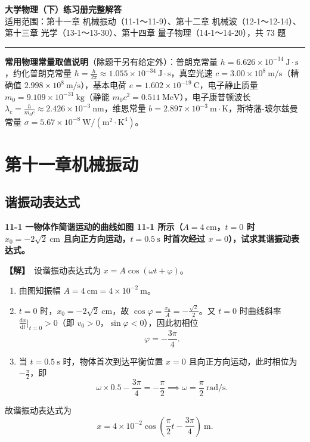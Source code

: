 \documentclass[zihao=5,a4paper,UTF8]{ctexart}
\newenvironment{prob}[2]{%
    \par\vspace{6pt}\noindent\textbf{\color{navy}#1} \textbf{#2}\par\nopagebreak\vspace{2pt}%
}{%
    \par\vspace{4pt}%
}
\newcommand{\sol}{\noindent\textbf{\color{tealaccent}【解】}\ }
\newcommand{\dd}{\mathrm{d}}
\begin{document}
\begin{center}
    {\Huge\bfseries\color{navy} 大学物理（下）练习册完整解答}\\[6pt]
    {\small\color{gray} 适用范围：第十一章 机械振动（11-1～11-9）、第十二章 机械波（12-1～12-14）、第十三章 光学（13-1～13-30）、第十四章 量子物理（14-1～14-20），共 73 题}
\end{center}
\vspace{2pt}
\hrule
\vspace{6pt}

\begin{tcolorbox}[colback=softbg, colframe=navy, boxrule=0.6pt, arc=2pt, left=8pt, right=8pt, top=5pt, bottom=5pt]
\small
\textbf{常用物理常量取值说明}（除题干另有给定外）：普朗克常量 $h = 6.626\times 10^{-34}\ \mathrm{J\cdot s}$，约化普朗克常量 $\hbar = \frac{h}{2\pi} \approx 1.055\times 10^{-34}\ \mathrm{J\cdot s}$，真空光速 $c = 3.00\times 10^{8}\ \mathrm{m/s}$（精确值 $2.998\times 10^{8}\ \mathrm{m/s}$），基本电荷 $e = 1.602\times 10^{-19}\ \mathrm{C}$，电子静止质量 $m_0 = 9.109\times 10^{-31}\ \mathrm{kg}$（静能 $m_0 c^2 = 0.511\ \mathrm{MeV}$），电子康普顿波长 $\lambda_c = \frac{h}{m_0 c} \approx 2.426\times 10^{-3}\ \mathrm{nm}$，维恩常量 $b = 2.897\times 10^{-3}\ \mathrm{m\cdot K}$，斯特藩-玻尔兹曼常量 $\sigma = 5.67\times 10^{-8}\ \mathrm{W/(m^2\cdot K^4)}$。
\end{tcolorbox}

\section{第十一章\quad 机械振动}

\subsection{谐振动表达式}

\begin{prob}{11-1}{一物体作简谐运动的曲线如图 11-1 所示（$A = 4\ \mathrm{cm}$，$t=0$ 时 $x_0 = -2\sqrt{2}\ \mathrm{cm}$ 且向正方向运动，$t=0.5\ \mathrm{s}$ 时首次经过 $x=0$），试求其谐振动表达式。}
\sol 设谐振动表达式为 $x = A\cos(\omega t + \varphi)$。
\begin{enumerate}[leftmargin=2em, itemsep=2pt]
    \item 由图知振幅 $A = 4\ \mathrm{cm} = 4\times 10^{-2}\ \mathrm{m}$。
    \item $t=0$ 时，$x_0 = -2\sqrt{2}\ \mathrm{cm}$，故 $\cos\varphi = \frac{x_0}{A} = -\frac{\sqrt{2}}{2}$。又 $t=0$ 时曲线斜率 $\frac{\dd x}{\dd t}\big|_{t=0} > 0$（即 $v_0 > 0$，$\sin\varphi < 0$），因此初相位
    \[
        \varphi = -\frac{3\pi}{4}.
    \]
    \item 当 $t = 0.5\ \mathrm{s}$ 时，物体首次到达平衡位置 $x = 0$ 且向正方向运动，此时相位为 $-\frac{\pi}{2}$，即
    \[
        \omega \times 0.5 - \frac{3\pi}{4} = -\frac{\pi}{2} \implies \omega = \frac{\pi}{2}\ \mathrm{rad/s}.
    \]
\end{enumerate}
故谐振动表达式为
\[
    x = 4\times 10^{-2}\cos\left(\frac{\pi}{2}t - \frac{3\pi}{4}\right)\ \mathrm{m}.
\]
\end{prob}
\end{document}

